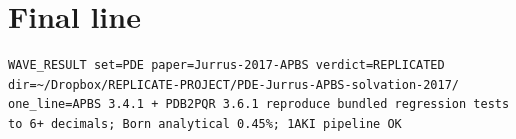 \documentclass[11pt]{article}
\begin{document}
\section{Final line}

\begin{lstlisting}
WAVE_RESULT set=PDE paper=Jurrus-2017-APBS verdict=REPLICATED
dir=~/Dropbox/REPLICATE-PROJECT/PDE-Jurrus-APBS-solvation-2017/
one_line=APBS 3.4.1 + PDB2PQR 3.6.1 reproduce bundled regression tests
to 6+ decimals; Born analytical 0.45%; 1AKI pipeline OK
\end{lstlisting}
\end{document}
